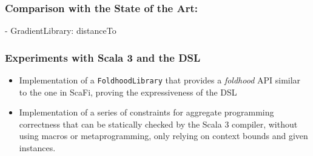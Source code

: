 %         

%         

\begin{frame}
    \frametitle{Comparison with the State of the Art: \this}
    \begin{exampleblock}{\this - GradientLibrary: distanceTo}
        
    \end{exampleblock}
\end{frame}

\begin{frame}
    \frametitle{Experiments with Scala 3 and the \ac{DSL}}
    \begin{itemize}
        \item Implementation of a \texttt{FoldhoodLibrary} that provides a \textit{foldhood} \ac{API} similar to the one in ScaFi, proving the expressiveness of the \this \ac{DSL}
        \item Implementation of a series of constraints for aggregate programming correctness that can be statically checked by the Scala 3 compiler, without using macros or metaprogramming, only relying on context bounds and given instances.
    \end{itemize}
\end{frame}

